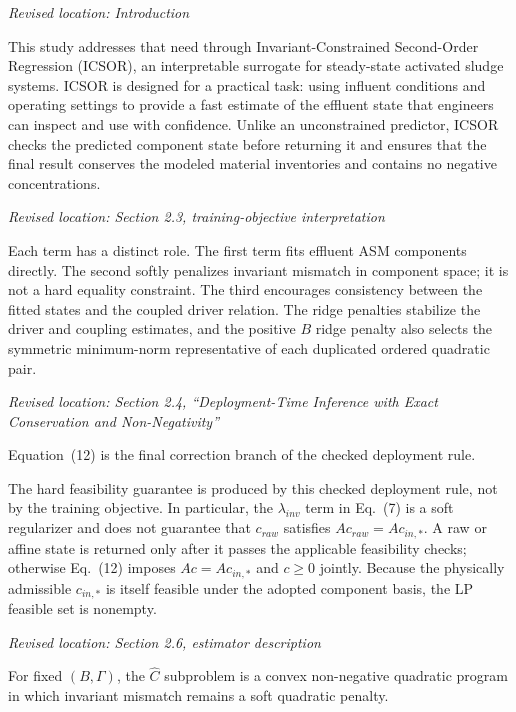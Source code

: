 \documentclass[11pt,a4paper]{article}
\newcommand{\excerptlocation}[1]{\par\noindent\textit{Revised location: #1}\par}
\begin{document}
\excerptlocation{Introduction}
\begin{revisionexcerpt}
This study addresses that need through Invariant-Constrained Second-Order Regression (ICSOR), an interpretable surrogate for steady-state activated sludge systems. ICSOR is designed for a practical task: using influent conditions and operating settings to provide a fast estimate of the effluent state that engineers can inspect and use with confidence. Unlike an unconstrained predictor, ICSOR checks the predicted component state before returning it and ensures that the final result conserves the modeled material inventories and contains no negative concentrations.
\end{revisionexcerpt}

\excerptlocation{Section 2.3, training-objective interpretation}
\begin{revisionexcerpt}
Each term has a distinct role. The first term fits effluent ASM components directly. The second softly penalizes invariant mismatch in component space; it is not a hard equality constraint. The third encourages consistency between the fitted states and the coupled driver relation. The ridge penalties stabilize the driver and coupling estimates, and the positive $B$ ridge penalty also selects the symmetric minimum-norm representative of each duplicated ordered quadratic pair.
\end{revisionexcerpt}

\excerptlocation{Section 2.4, ``Deployment-Time Inference with Exact Conservation and Non-Negativity''}
\begin{revisionexcerpt}
Equation~(12) is the final correction branch of the checked deployment rule.

The hard feasibility guarantee is produced by this checked deployment rule, not by the training objective. In particular, the $\lambda_{inv}$ term in Eq.~(7) is a soft regularizer and does not guarantee that $c_{raw}$ satisfies $Ac_{raw}=Ac_{in,*}$. A raw or affine state is returned only after it passes the applicable feasibility checks; otherwise Eq.~(12) imposes $Ac=Ac_{in,*}$ and $c\geq 0$ jointly. Because the physically admissible $c_{in,*}$ is itself feasible under the adopted component basis, the LP feasible set is nonempty.
\end{revisionexcerpt}

\excerptlocation{Section 2.6, estimator description}
\begin{revisionexcerpt}
For fixed $(B, \Gamma)$, the $\widehat{C}$ subproblem is a convex non-negative quadratic program in which invariant mismatch remains a soft quadratic penalty.
\end{revisionexcerpt}
\end{document}
